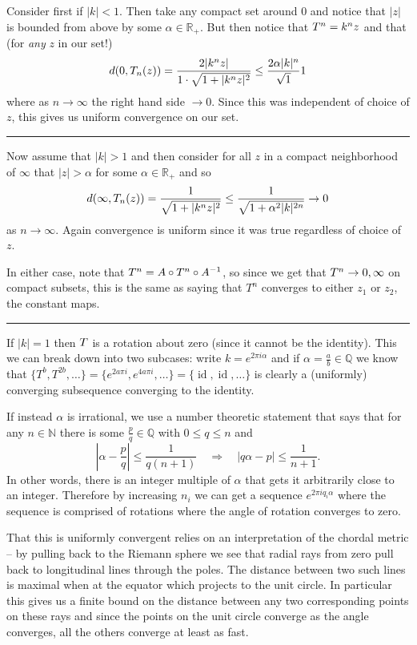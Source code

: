 \documentclass[12pt]{article}
\newcommand*{\N}{
\mathbb{N}
}
\newcommand*{\R}{
\mathbb{R}
}
\newcommand*{\Q}{
\mathbb{Q}
}
\newcommand*{\brk}{
\rule{2in}{.1pt}
}
\let\tilde\relax
\newcommand*{\tilde}[1]{\widetilde{#1}}
\begin{document}
	Consider first if $|k|<1$. Then take any compact set around 0 and notice that $|z|$ is bounded from above by some $\alpha\in\R_+$. But then notice that $\tilde T^n=k^nz$ and that (for \textit{any} $z$ in our set!)
	\[d(0,\tilde T_n(z))=\frac{2|k^nz|}{1\cdot\sqrt{1+|k^n z|^2}}\le \frac{2\alpha|k|^n}{\sqrt{1}}1\]
	where as $n\to\infty$ the right hand side $\to 0$. Since this was independent of choice of $z$, this gives us uniform convergence on our set.
	
	\brk
	
	Now assume that $|k|>1$ and then consider for all $z$ in a compact neighborhood of $\infty$ that $|z|>\alpha$ for some $\alpha\in\R_+$ and so
	\[d(\infty, \tilde T_n(z))=\frac{1}{\sqrt{1+|k^nz|^2}}\le \frac{1}{\sqrt{1+\alpha^2|k|^{2n}}}\to 0\]
	as $n\to\infty$. Again convergence is uniform since it was true regardless of choice of $z$.
	
	In either case, note that $\tilde T^n=A\circ T^n\circ A^{-1}$, so since we get that $\tilde T^n\to 0,\infty$ on compact subsets, this is the same as saying that $T^n$ converges to either $z_1$ or $z_2$, the constant maps.
	
	\brk
	
	If $|k|=1$ then $\tilde T$ is a rotation about zero (since it cannot be the identity). This we can break down into two subcases: write $k=e^{2\pi i\alpha}$ and if $\alpha=\frac{a}{b}\in\Q$ we know that $\{T^b,T^{2b},\dots\}=\{e^{2a\pi i},e^{4a\pi i},\dots\}=\{\operatorname{id},\operatorname{id},\dots\}$ is clearly a (uniformly) converging subsequence converging to the identity.
	
	If instead $\alpha$ is irrational, we use a number theoretic statement that says that for any $n\in\N$ there is some $\frac{p}{q}\in\Q$ with $0\le q\le n$ and\
	\[\left|\alpha-\frac{p}{q}\right|\le\frac{1}{q(n+1)}\quad\Rightarrow\quad |q\alpha-p|\le\frac{1}{n+1}.\]
	In other words, there is an integer multiple of $\alpha$ that gets it arbitrarily close to an integer. Therefore by increasing $n_i$ we can get a sequence $e^{2\pi i q_i\alpha}$ where the sequence is comprised of rotations where the angle of rotation converges to zero.
	
	That this is uniformly convergent relies on an interpretation of the chordal metric -- by pulling back to the Riemann sphere we see that radial rays from zero pull back to longitudinal lines through the poles. The distance between two such lines is maximal when at the equator which projects to the unit circle. In particular this gives us a finite bound on the distance between any two corresponding points on these rays and since the points on the unit circle converge as the angle converges, all the others converge at least as fast.
	
\end{document}
